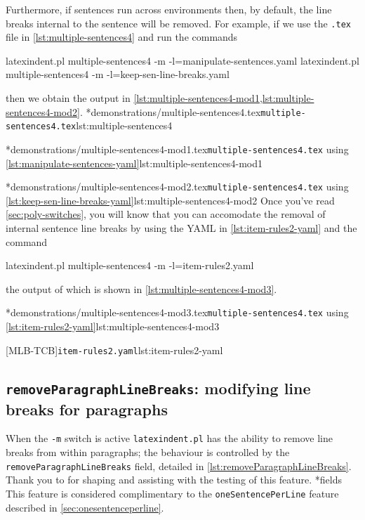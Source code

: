 	Furthermore, if sentences run across environments then, by default, the line breaks internal to the sentence will be removed.
	For example, if we use the \texttt{.tex} file in \cref{lst:multiple-sentences4} and run the commands
	\begin{commandshell}
latexindent.pl multiple-sentences4 -m -l=manipulate-sentences.yaml
latexindent.pl multiple-sentences4 -m -l=keep-sen-line-breaks.yaml
	\end{commandshell}
	then we obtain the output in \cref{lst:multiple-sentences4-mod1,lst:multiple-sentences4-mod2}.
	\cmhlistingsfromfile*[showspaces=false]*{demonstrations/multiple-sentences4.tex}{\texttt{multiple-sentences4.tex}}{lst:multiple-sentences4}
	\begin{widepage}
		\cmhlistingsfromfile*[showspaces=false]*{demonstrations/multiple-sentences4-mod1.tex}{\texttt{multiple-sentences4.tex} using \vref{lst:manipulate-sentences-yaml}}{lst:multiple-sentences4-mod1}
	\end{widepage}
	\cmhlistingsfromfile*[showspaces=false]*{demonstrations/multiple-sentences4-mod2.tex}{\texttt{multiple-sentences4.tex} using \vref{lst:keep-sen-line-breaks-yaml}}{lst:multiple-sentences4-mod2}
	Once you've read \cref{sec:poly-switches}, you will know that you can accomodate the removal of internal sentence line breaks
	by using the YAML in \cref{lst:item-rules2-yaml} and the command
	\begin{commandshell}
latexindent.pl multiple-sentences4 -m -l=item-rules2.yaml
	\end{commandshell}
	the output of which is shown in \cref{lst:multiple-sentences4-mod3}.

	\begin{minipage}{.5\linewidth}
		\cmhlistingsfromfile*[showspaces=false]*{demonstrations/multiple-sentences4-mod3.tex}{\texttt{multiple-sentences4.tex} using \cref{lst:item-rules2-yaml}}{lst:multiple-sentences4-mod3}
	\end{minipage}
	\hfill
	\begin{minipage}{.5\linewidth}
		[MLB-TCB]{\texttt{item-rules2.yaml}}{lst:item-rules2-yaml}
	\end{minipage}

\subsection{\texttt{removeParagraphLineBreaks}: modifying line breaks for paragraphs}
	When the \texttt{-m} switch is active \texttt{latexindent.pl} has the ability to remove line breaks
	from within paragraphs; the behaviour is controlled by the \texttt{removeParagraphLineBreaks} field, detailed in
	\cref{lst:removeParagraphLineBreaks}. Thank you to \cite{jowens} for shaping and assisting with the testing of this feature.
*{fields}
This feature is considered complimentary to the \texttt{oneSentencePerLine} feature described in \vref{sec:onesentenceperline}.

